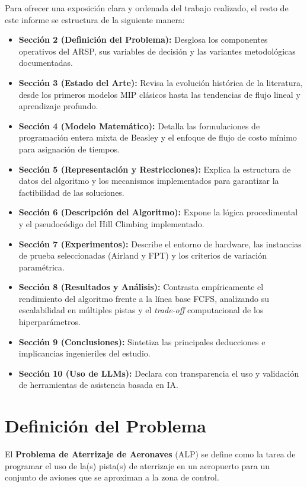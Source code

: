 \documentclass[letter, 10pt]{article}
\begin{document}
Para ofrecer una exposición clara y ordenada del trabajo realizado, el resto de este informe se estructura de la siguiente manera:
\begin{itemize}
    \item \textbf{Sección 2 (Definición del Problema):} Desglosa los componentes operativos del ARSP, sus variables de decisión y las variantes metodológicas documentadas.
    \item \textbf{Sección 3 (Estado del Arte):} Revisa la evolución histórica de la literatura, desde los primeros modelos MIP clásicos hasta las tendencias de flujo lineal y aprendizaje profundo.
    \item \textbf{Sección 4 (Modelo Matemático):} Detalla las formulaciones de programación entera mixta de Beasley y el enfoque de flujo de costo mínimo para asignación de tiempos.
    \item \textbf{Sección 5 (Representación y Restricciones):} Explica la estructura de datos del algoritmo y los mecanismos implementados para garantizar la factibilidad de las soluciones.
    \item \textbf{Sección 6 (Descripción del Algoritmo):} Expone la lógica procedimental y el pseudocódigo del Hill Climbing implementado.
    \item \textbf{Sección 7 (Experimentos):} Describe el entorno de hardware, las instancias de prueba seleccionadas (Airland y FPT) y los criterios de variación paramétrica.
    \item \textbf{Sección 8 (Resultados y Análisis):} Contrasta empíricamente el rendimiento del algoritmo frente a la línea base FCFS, analizando su escalabilidad en múltiples pistas y el \textit{trade-off} computacional de los hiperparámetros.
    \item \textbf{Sección 9 (Conclusiones):} Sintetiza las principales deducciones e implicancias ingenieriles del estudio.
    \item \textbf{Sección 10 (Uso de LLMs):} Declara con transparencia el uso y validación de herramientas de asistencia basada en IA.
\end{itemize}

\section{Definici\'on del Problema}

El \textbf{Problema de Aterrizaje de Aeronaves} (ALP) se define como la tarea de programar el uso de la(s) pista(s) de aterrizaje en un aeropuerto para un conjunto de aviones que se aproximan a la zona de control.
\end{document}
